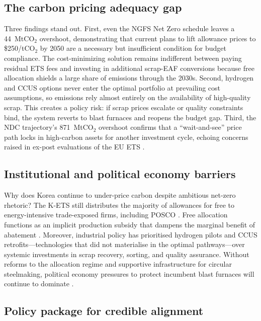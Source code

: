 \documentclass[preprint,1p,authoryear]{elsarticle}
\begin{document}
\subsection{The carbon pricing adequacy gap}

Three findings stand out. First, even the NGFS Net Zero schedule leaves a 44~MtCO$_2$ overshoot, demonstrating that current plans to lift allowance prices to \$250/tCO$_2$ by 2050 are a necessary but insufficient condition for budget compliance. The cost-minimizing solution remains indifferent between paying residual ETS fees and investing in additional scrap-EAF conversions because free allocation shields a large share of emissions through the 2030s. Second, hydrogen and CCUS options never enter the optimal portfolio at prevailing cost assumptions, so emissions rely almost entirely on the availability of high-quality scrap. This creates a policy risk: if scrap prices escalate or quality constraints bind, the system reverts to blast furnaces and reopens the budget gap. Third, the NDC trajectory's 871~MtCO$_2$ overshoot confirms that a “wait-and-see” price path locks in high-carbon assets for another investment cycle, echoing concerns raised in ex-post evaluations of the EU ETS \citep{Green2021, martin2016industry}.

\subsection{Institutional and political economy barriers}

Why does Korea continue to under-price carbon despite ambitious net-zero rhetoric? The K-ETS still distributes the majority of allowances for free to energy-intensive trade-exposed firms, including POSCO \citep{kim2021kets, ICAP2024}. Free allocation functions as an implicit production subsidy that dampens the marginal benefit of abatement \citep{neuhoff2012inclusion}. Moreover, industrial policy has prioritised hydrogen pilots and CCUS retrofits—technologies that did not materialise in the optimal pathways—over systemic investments in scrap recovery, sorting, and quality assurance. Without reforms to the allocation regime and supportive infrastructure for circular steelmaking, political economy pressures to protect incumbent blast furnaces will continue to dominate \citep{MaterialEconomics2019}.

\subsection{Policy package for credible alignment}
\end{document}
